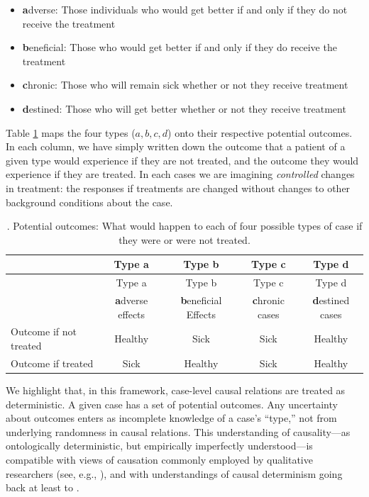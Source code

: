 \documentclass[
  12pt,
]{book}
\providecommand{\tightlist}{%
  \setlength{\itemsep}{0pt}\setlength{\parskip}{0pt}}
\begin{document}
\begin{itemize}
\tightlist
\item
  \textbf{a}dverse: Those individuals who would get better if and only if they do not receive the treatment
\item
  \textbf{b}eneficial: Those who would get better if and only if they do receive the treatment
\item
  \textbf{c}hronic: Those who will remain sick whether or not they receive treatment
\item
  \textbf{d}estined: Those who will get better whether or not they receive treatment
\end{itemize}

Table \ref{tab:PO} maps the four types (\(a, b, c, d\)) onto their respective potential outcomes. In each column, we have simply written down the outcome that a patient of a given type would experience if they are not treated, and the outcome they would experience if they are treated. In each cases we are imagining \emph{controlled} changes in treatment: the responses if treatments are changed without changes to other background conditions about the case.

\begin{longtable}[]{@{}lcccc@{}}
\caption{\label{tab:PO}. Potential outcomes: What would happen to each of four possible types of case if they were or were not treated.}\tabularnewline
\toprule
\small & Type a & Type b & Type c & Type d \\
\midrule
\endfirsthead
\toprule
\small & Type a & Type b & Type c & Type d \\
\midrule
\endhead
& \textbf{a}dverse effects & \textbf{b}eneficial Effects & \textbf{c}hronic cases & \textbf{d}estined cases \\
Outcome if not treated & Healthy & Sick & Sick & Healthy \\
Outcome if treated & Sick & Healthy & Sick & Healthy \\
\bottomrule
\end{longtable}

We highlight that, in this framework, case-level causal relations are treated as deterministic. A given case has a set of potential outcomes. Any uncertainty about outcomes enters as incomplete knowledge of a case's ``type,'' not from underlying randomness in causal relations. This understanding of causality---as ontologically deterministic, but empirically imperfectly understood---is compatible with views of causation commonly employed by qualitative researchers (see, e.g., \citet{mahoney2008toward}), and with understandings of causal determinism going back at least to \citet{laplace1901philosophical}.
\end{document}
